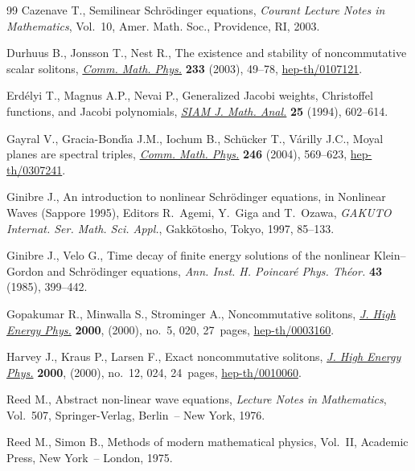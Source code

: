 \documentclass[11pt]{article}
\begin{document}
\begin{thebibliography}{99}
Cazenave T.,
Semilinear Schr{\"o}dinger equations,
{\it Courant Lecture Notes in Mathematics}, Vol.~10, Amer. Math. Soc., Providence, RI, 2003.

Durhuus B., Jonsson T., Nest R.,
The existence and stability of noncommutative scalar solitons,
\href{http://dx.doi.org/10.1007/s00220-002-0721-4}{{\it Comm. Math. Phys.}} {\bf 233} (2003), 49--78,
\href{http://arxiv.org/abs/hep-th/0107121}{hep-th/0107121}.

Erd{\'e}lyi T., Magnus  A.P., Nevai P.,
Generalized Jacobi weights, Christof\/fel functions, and Jacobi polynomials,
\href{http://dx.doi.org/10.1137/S0036141092236863}{{\it SIAM J. Math. Anal.}} {\bf 25} (1994), 602--614.

Gayral V., Gracia-Bond\'{\i}a J.M., Iochum B., Sch\"ucker T.,  V\'arilly J.C.,
Moyal planes are spectral triples,
\href{http://dx.doi.org/10.1007/s00220-004-1057-z}{{\it Comm. Math. Phys.}} \textbf{246} (2004), 569--623,
\href{http://arxiv.org/abs/hep-th/0307241}{hep-th/0307241}.

Ginibre J.,
An introduction to nonlinear Schr{\"o}dinger equations,
in Nonlinear Waves (Sappore 1995), Editors R.~Agemi, Y.~Giga and T.~Ozawa,
{\it GAKUTO Internat. Ser. Math. Sci. Appl.}, Gakk{\=o}tosho, Tokyo, 1997,  85--133.

Ginibre J., Velo G.,
Time decay of f\/inite energy solutions of the nonlinear Klein--Gordon and Schr{\"o}dinger equations,
{\it Ann. Inst. H. Poincar{\'e} Phys. Th{\'e}or.} {\bf 43} (1985), 399--442.

Gopakumar R., Minwalla S., Strominger A.,
Noncommutative solitons,
\href{http://dx.doi.org/10.1088/1126-6708/2000/05/020}{{\it J. High Energy Phys.}} {\bf 2000}, (2000), no.~5, 020, 27~pages,
\href{http://arxiv.org/abs/hep-th/0003160}{hep-th/0003160}.

Harvey J., Kraus P., Larsen F.,
Exact noncommutative solitons,
 \href{http://dx.doi.org/10.1088/1126-6708/2000/12/024}{{\it J. High Energy Phys.}} {\bf 2000}, (2000), no.~12, 024, 24~pages,
 \href{http://arxiv.org/abs/hep-th/0010060}{hep-th/0010060}.

Reed M.,
Abstract non-linear wave equations,
{\it Lecture Notes in Mathematics}, Vol.~507, Springer-Verlag,
  Berlin~-- New York, 1976.

Reed  M., Simon B.,
Methods of modern mathematical physics, Vol.~II, Academic Press, New York~-- London, 1975.


\end{thebibliography}
\end{document}
